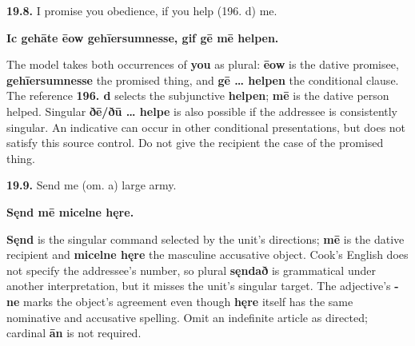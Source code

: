 \par\begin{minipage}{\linewidth}\raggedright
\textbf{19.8.} I promise you obedience, if you help (196. d) me.

\textbf{Ic gehāte ēow gehīersumnesse, gif gē mē helpen.}

The model takes both occurrences of \textbf{you} as plural: \textbf{ēow} is the dative promisee, \textbf{gehīersumnesse} the promised thing, and \textbf{gē … helpen} the conditional clause. The reference \textbf{196. d} selects the subjunctive \textbf{helpen}; \textbf{mē} is the dative person helped. Singular \textbf{ðē/\allowbreak{}ðū … helpe} is also possible if the addressee is consistently singular. An indicative can occur in other conditional presentations, but does not satisfy this source control. Do not give the recipient the case of the promised thing.

\end{minipage}\par\addvspace{4pt}

\par\begin{minipage}{\linewidth}\raggedright
\textbf{19.9.} Send me (om. a) large army.

\textbf{Sęnd mē micelne hęre.}

\textbf{Sęnd} is the singular command selected by the unit's directions; \textbf{mē} is the dative recipient and \textbf{micelne hęre} the masculine accusative object. Cook's English does not specify the addressee's number, so plural \textbf{sęndað} is grammatical under another interpretation, but it misses the unit's singular target. The adjective's \textbf{-ne} marks the object's agreement even though \textbf{hęre} itself has the same nominative and accusative spelling. Omit an indefinite article as directed; cardinal \textbf{ān} is not required.

\end{minipage}\par\addvspace{4pt}

